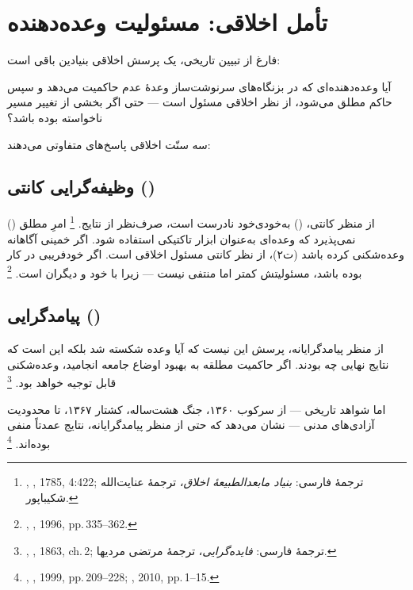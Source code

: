 \section{تأمل اخلاقی: مسئولیت وعده‌دهنده}
\label{sec:ch16-ethics}

فارغ از تبیین تاریخی، یک پرسش اخلاقی بنیادین باقی است:

\begin{warningBox}
آیا وعده‌دهنده‌ای که در بزنگاه‌های سرنوشت‌ساز
وعدهٔ عدم حاکمیت می‌دهد و سپس حاکم مطلق می‌شود،
از نظر اخلاقی مسئول است —
حتی اگر بخشی از تغییر مسیر ناخواسته بوده باشد؟
\end{warningBox}

سه سنّت اخلاقی پاسخ‌های متفاوتی می‌دهند:

\subsection{وظیفه‌گرایی کانتی ()}

از منظر کانتی،  ()
به‌خودی‌خود نادرست است،
صرف‌نظر از نتایج.%
\footnote{%
,
\textit{},
1785, 4:422;
ترجمهٔ فارسی: \textit{بنیاد مابعدالطبیعهٔ اخلاق}، ترجمهٔ عنایت‌الله شکیباپور.}
امرِ مطلق ()
نمی‌پذیرد که وعده‌ای به‌عنوان ابزار تاکتیکی استفاده شود.
اگر خمینی آگاهانه وعده‌شکنی کرده باشد (ت‌۲)،
از نظر کانتی مسئول اخلاقی است.
اگر خودفریبی در کار بوده باشد،
مسئولیتش کمتر اما منتفی نیست —
زیرا 
با خود و دیگران است.%
\footnote{%
,
\textit{}, 1996, pp.\,335–362.}

\subsection{پیامدگرایی ()}

از منظر پیامدگرایانه، پرسش این نیست
که آیا وعده شکسته شد بلکه این است
که نتایج نهایی چه بودند.
اگر حاکمیت مطلقه به بهبود اوضاع جامعه انجامید،
وعده‌شکنی قابل توجیه خواهد بود.%
\footnote{%
,
\textit{}, 1863, ch.\,2;
ترجمهٔ فارسی: \textit{فایده‌گرایی}، ترجمهٔ مرتضی مردیها.}

اما شواهد تاریخی — از سرکوب ۱۳۶۰،
جنگ هشت‌ساله، کشتار ۱۳۶۷،
تا محدودیت آزادی‌های مدنی — نشان می‌دهد
که حتی از منظر پیامدگرایانه،
نتایج عمدتاً منفی بوده‌اند.%
\footnote{%
,
\textit{}, 1999, pp.\,209–228;
, 2010, pp.\,1–15.}


